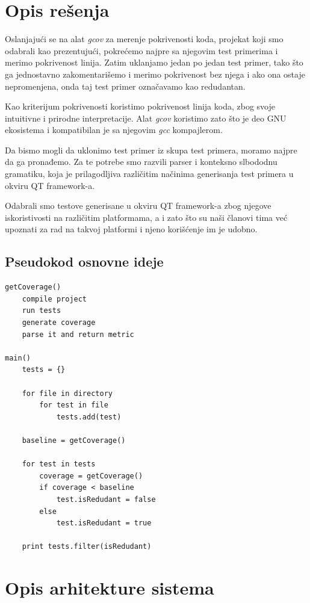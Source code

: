 \documentclass[a4paper]{article}
\theoremstyle{definition}
\begin{document}
\section{Opis rešenja}
\label{sec:opis_resenja}

Oslanjajući se na alat \textit{gcov} za merenje pokrivenosti koda, projekat koji smo odabrali kao prezentujući, pokrećemo najpre sa njegovim test primerima i merimo pokrivenost linija. Zatim uklanjamo jedan po jedan test primer, tako što ga jednostavno zakomentarišemo i merimo pokrivenost bez njega i ako ona ostaje nepromenjena, onda taj test primer označavamo kao redudantan.

Kao kriterijum pokrivenosti koristimo pokrivenost linija koda, zbog svoje intuitivne i prirodne interpretacije. Alat \textit{gcov} koristimo zato što je deo GNU ekosistema i kompatibilan je sa njegovim \textit{gcc} kompajlerom.

Da bismo mogli da uklonimo test primer iz skupa test primera, moramo najpre da ga pronađemo. Za te potrebe smo razvili parser i konteksno slbododnu gramatiku, koja je prilagodljiva različitim načinima generisanja test primera u okviru QT framework-a.

Odabrali smo testove generisane u okviru QT framework-a zbog njegove iskoristivosti na različitim platformama, a i zato što su naši članovi tima već upoznati za rad na takvoj platformi i njeno korišćenje im je udobno.

\subsection{Pseudokod osnovne ideje}
\label{subsec:pseudokod}
\begin{lstlisting}
getCoverage()
    compile project
    run tests
    generate coverage
    parse it and return metric
    
main()
    tests = {}
    
    for file in directory
        for test in file
            tests.add(test)
            
    baseline = getCoverage()
    
    for test in tests
        coverage = getCoverage()
        if coverage < baseline
            test.isRedudant = false
        else
            test.isRedudant = true
            
    print tests.filter(isRedudant)
\end{lstlisting}

\section{Opis arhitekture sistema}
\label{sec:arhitektura}
\end{document}
